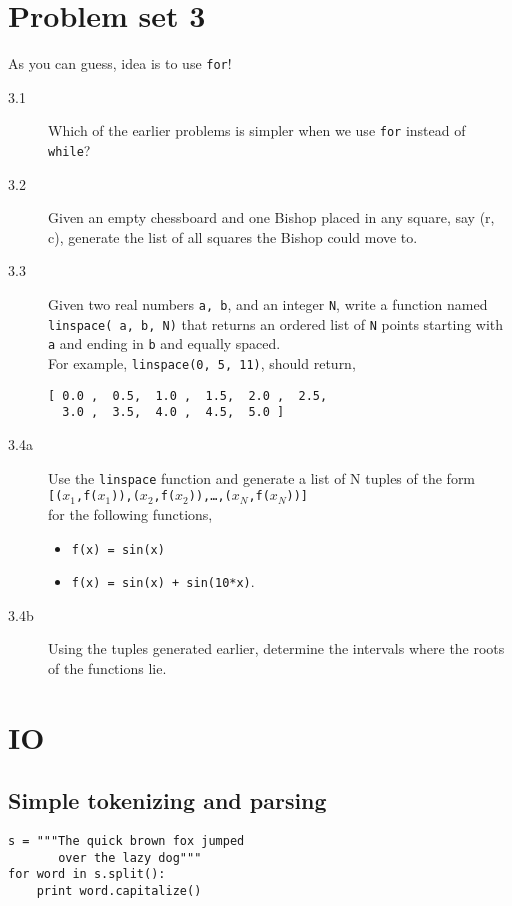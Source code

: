 \documentclass[12pt]{article}
\begin{document}
\section{Problem set 3}
  As you can guess, idea is to use \texttt{for}!

\begin{description}
  \item[3.1] Which of the earlier problems is simpler when we use \texttt{for} instead of \texttt{while}? 
  \item[3.2] Given an empty chessboard and one Bishop placed in any square, say (r, c), generate the list of all squares the Bishop could move to.
  \item[3.3] Given two real numbers \texttt{a, b}, and an integer \texttt{N}, write a
  function named \texttt{linspace( a, b, N)} that returns an ordered list
  of \texttt{N} points starting with \texttt{a} and ending in \texttt{b} and
  equally spaced.\\
  For example, \texttt{linspace(0, 5, 11)}, should return, \\
\begin{verbatim}
[ 0.0 ,  0.5,  1.0 ,  1.5,  2.0 ,  2.5,  
  3.0 ,  3.5,  4.0 ,  4.5,  5.0 ]
\end{verbatim}
  \item[3.4a] Use the \texttt{linspace} function and generate a list of N tuples of the form\\
\texttt{[($x_1$,f($x_1$)),($x_2$,f($x_2$)),\ldots,($x_N$,f($x_N$))]}\\for the following functions,
\begin{itemize}
  \item \texttt{f(x) = sin(x)}
  \item \texttt{f(x) = sin(x) + sin(10*x)}.
\end{itemize}

\item[3.4b] Using the tuples generated earlier, determine the intervals where the roots of the functions lie.
\end{description}

\section{IO}
  \subsection{Simple tokenizing and parsing}
  \begin{verbatim}
s = """The quick brown fox jumped
       over the lazy dog"""
for word in s.split():
    print word.capitalize()
  \end{verbatim}
\end{document}
